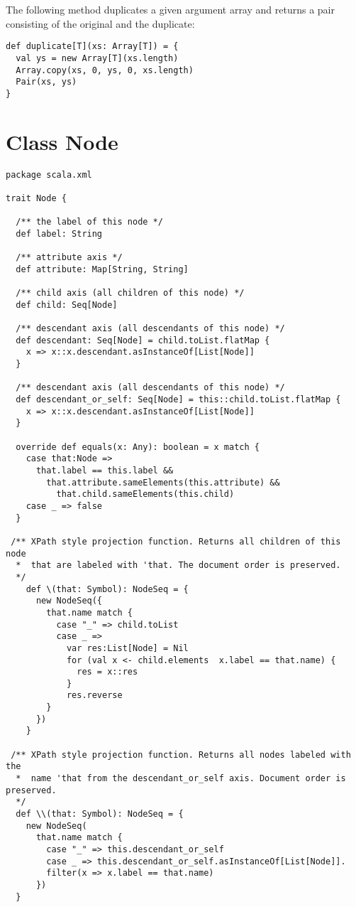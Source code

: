 {\example The following method duplicates a given argument array and returns a pair consisting of the original and the duplicate:
\begin{lstlisting}
def duplicate[T](xs: Array[T]) = {
  val ys = new Array[T](xs.length)
  Array.copy(xs, 0, ys, 0, xs.length)
  Pair(xs, ys)
}
\end{lstlisting}

\section{Class Node}\label{cls:Node}
\begin{lstlisting}
package scala.xml 

trait Node {

  /** the label of this node */
  def label: String               

  /** attribute axis */
  def attribute: Map[String, String] 

  /** child axis (all children of this node) */
  def child: Seq[Node]          

  /** descendant axis (all descendants of this node) */
  def descendant: Seq[Node] = child.toList.flatMap { 
    x => x::x.descendant.asInstanceOf[List[Node]] 
  } 

  /** descendant axis (all descendants of this node) */
  def descendant_or_self: Seq[Node] = this::child.toList.flatMap { 
    x => x::x.descendant.asInstanceOf[List[Node]] 
  } 

  override def equals(x: Any): boolean = x match {
    case that:Node => 
      that.label == this.label && 
        that.attribute.sameElements(this.attribute) && 
          that.child.sameElements(this.child)
    case _ => false
  } 

 /** XPath style projection function. Returns all children of this node
  *  that are labeled with 'that. The document order is preserved.
  */
    def \(that: Symbol): NodeSeq = {
      new NodeSeq({
        that.name match {
          case "_" => child.toList  
          case _ =>
            var res:List[Node] = Nil 
            for (val x <- child.elements  x.label == that.name) {
              res = x::res 
            }
            res.reverse
        }
      }) 
    }

 /** XPath style projection function. Returns all nodes labeled with the 
  *  name 'that from the descendant_or_self axis. Document order is preserved.
  */
  def \\(that: Symbol): NodeSeq = {
    new NodeSeq(
      that.name match {
        case "_" => this.descendant_or_self 
        case _ => this.descendant_or_self.asInstanceOf[List[Node]].
        filter(x => x.label == that.name) 
      })
  }


\end{lstlisting}}

